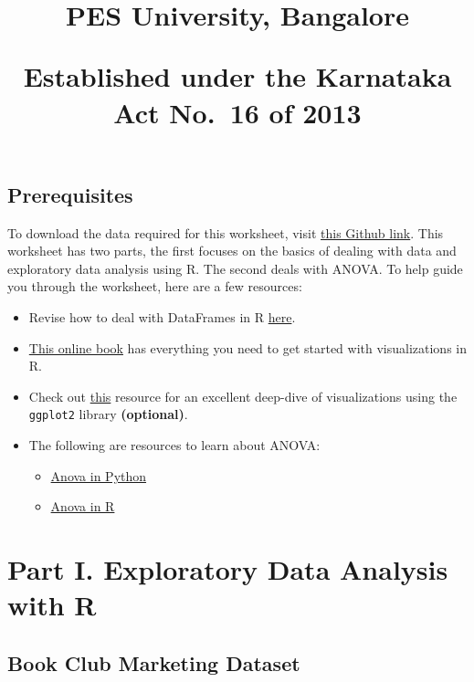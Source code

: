 \documentclass[
]{article}
\title{PES University, Bangalore

Established under the Karnataka Act No.~16 of 2013}
\subtitle{\textbf{UE20CS312 - Data Analytics}

\textbf{Worksheet 1a - Part 2: EDA with R \textbar{} ANOVA}

Harshith Mohan Kumar -
\href{mailto:harshithmohankumar@pesu.pes.edu}{\nolinkurl{harshithmohankumar@pesu.pes.edu}}

Yashas Kadambi -
\href{mailto:yashasks@pesu.pes.edu}{\nolinkurl{yashasks@pesu.pes.edu}}

Nishanth M S -
\href{mailto:nishanthmsathish.23@gmail.com}{\nolinkurl{nishanthmsathish.23@gmail.com}}

Anushka Hebbar -
\href{mailto:anushkahebbar@pesu.pes.edu}{\nolinkurl{anushkahebbar@pesu.pes.edu}}}
\author{}
\date{\vspace{-2.5em}}
\providecommand{\tightlist}{%
  \setlength{\itemsep}{0pt}\setlength{\parskip}{0pt}}
\begin{document}
\maketitle

\hypertarget{prerequisites}{%
\subsection{Prerequisites}\label{prerequisites}}

To download the data required for this worksheet, visit
\href{https://tinyurl.com/da22-worksheet1a-part2}{this Github link}.
This worksheet has two parts, the first focuses on the basics of dealing
with data and exploratory data analysis using R. The second deals with
ANOVA. To help guide you through the worksheet, here are a few
resources:

\begin{itemize}
\tightlist
\item
  Revise how to deal with DataFrames in R
  \href{https://www.tutorialspoint.com/r/r_data_frames.htm}{here}.
\item
  \href{https://r-graphics.org/}{This online book} has everything you
  need to get started with visualizations in R.
\item
  Check out
  \href{https://joeystanley.com/downloads/171012-ggplot2_handout.pdf}{this}
  resource for an excellent deep-dive of visualizations using the
  \texttt{ggplot2} library \textbf{(optional)}.
\item
  The following are resources to learn about ANOVA:

  \begin{itemize}
  \tightlist
  \item
    \href{https://www.reneshbedre.com/blog/anova.html}{Anova in Python}
  \item
    \href{https://www.scribbr.com/statistics/anova-in-r/}{Anova in R}
  \end{itemize}
\end{itemize}

\hypertarget{part-i.-exploratory-data-analysis-with-r}{%
\section{Part I. Exploratory Data Analysis with
R}\label{part-i.-exploratory-data-analysis-with-r}}

\hypertarget{book-club-marketing-dataset}{%
\subsection{Book Club Marketing
Dataset}\label{book-club-marketing-dataset}}
\end{document}
